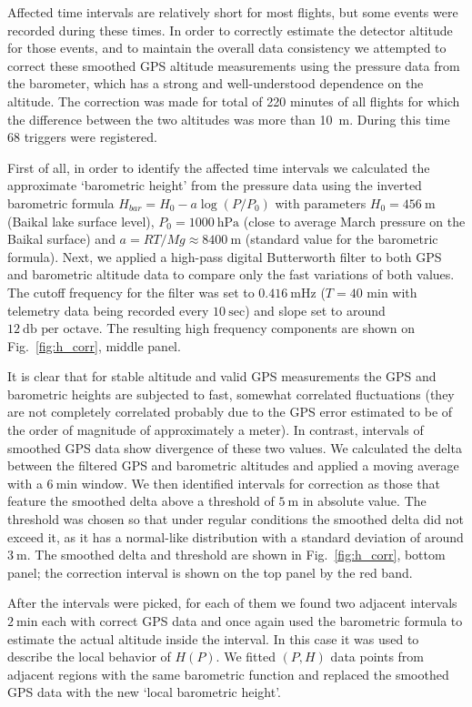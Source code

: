 \documentclass[preprint,5p,times]{elsarticle}
\begin{document}
Affected time intervals are relatively short for most flights, but some events were recorded during these times. In order to correctly estimate the detector altitude for those events, and to maintain the overall data consistency we attempted to correct these smoothed GPS altitude measurements using the pressure data from the barometer, which has a strong and well-understood dependence on the altitude. The correction was made for total of 220 minutes of all flights for which the difference between the two altitudes was more than 10~m. During this time 68 triggers were registered.

First of all, in order to identify the affected time intervals we calculated the approximate `barometric height' from the pressure data using the inverted barometric formula $H_{bar} = H_0 - a \log (P/P_0)$ with parameters $H_0 = 456~\textrm{m}$ (Baikal lake surface level), $P_0 = 1000~\textrm{hPa}$ (close to average March pressure on the Baikal surface) and $a = {RT}/{Mg} \approx 8400~\textrm{m}$ (standard value for the barometric formula). Next, we applied a high-pass digital Butterworth filter to both GPS and barometric altitude data to compare only the fast variations of both values. The cutoff frequency for the filter was set to $0.416~\textrm{mHz}$ ($T=40$ min with telemetry data being recorded every $10~\textrm{sec}$) and slope set to around $12~\textrm{db per octave}$. The resulting high frequency components are shown on Fig.~\ref{fig:h_corr}, middle panel.

It is clear that for stable altitude and valid GPS measurements the GPS and barometric heights are subjected to fast, somewhat correlated fluctuations (they are not completely correlated probably due to the GPS error estimated to be of the order of magnitude of approximately a meter). In contrast, intervals of smoothed GPS data show divergence of these two values. We calculated the delta between the filtered GPS and barometric altitudes and applied a moving average with a $6~\textrm{min}$ window. We then identified intervals for correction as those that feature the smoothed delta above a threshold of $5~\textrm{m}$ in absolute value. The threshold was chosen so that  under regular conditions the smoothed delta did not exceed it, as it has a normal-like distribution with a standard deviation of around $3~\textrm{m}$. The smoothed delta and threshold are shown in Fig.~\ref{fig:h_corr}, bottom panel; the correction interval is shown on the top panel by the red band.

After the intervals were picked, for each of them we found two adjacent intervals $2~\textrm{min}$ each with correct GPS data and once again used the barometric formula to estimate the actual altitude inside the interval. In this case it was used to describe the local behavior of $H(P)$. We fitted $(P, H)$ data points from adjacent regions with the same barometric function and replaced the smoothed GPS data with the new `local barometric height'.
\end{document}
